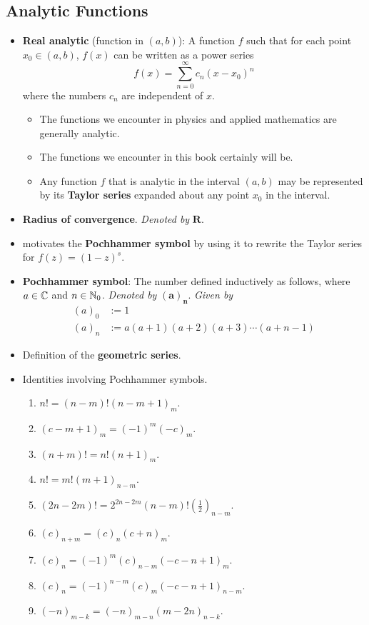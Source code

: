 \documentclass[../finalProject.tex]{subfiles}
\begin{document}
\subsection{Analytic Functions}\label{sss:2.2}
\begin{itemize}
    \item \textbf{Real analytic} (function in $(a,b)$): A function $f$ such that for each point $x_0\in(a,b)$, $f(x)$ can be written as a power series
    \begin{equation*}
        f(x) = \sum_{n=0}^\infty c_n(x-x_0)^n
    \end{equation*}
    where the numbers $c_n$ are independent of $x$.
    \begin{itemize}
        \item The functions we encounter in physics and applied mathematics are generally analytic.
        \item The functions we encounter in this book certainly will be.
        \item Any function $f$ that is analytic in the interval $(a,b)$ may be represented by its \textbf{Taylor series} expanded about any point $x_0$ in the interval.
    \end{itemize}
    \item \textbf{Radius of convergence}. \emph{Denoted by} $\bm{R}$.
    \item \textcite{bib:Seaborn} motivates the \textbf{Pochhammer symbol} by using it to rewrite the Taylor series for $f(z)=(1-z)^s$.
    \item \textbf{Pochhammer symbol}: The number defined inductively as follows, where $a\in\mathbb{C}$ and $n\in\mathbb{N}_0$. \emph{Denoted by} $\bm{(a)_n}$. \emph{Given by}
    \begin{align*}
        (a)_0 &:= 1\\
        (a)_n &:= a(a+1)(a+2)(a+3)\cdots(a+n-1)\tag{$n=1,2,3,\dots$}
    \end{align*}
    \item Definition of the \textbf{geometric series}.
    \item Identities involving Pochhammer symbols.
    \begin{enumerate}
        \item $n!=(n-m)!(n-m+1)_m$.
        \item $(c-m+1)_m=(-1)^m(-c)_m$.
        \item $(n+m)!=n!(n+1)_m$.
        \item $n!=m!(m+1)_{n-m}$.
        \item $(2n-2m)!=2^{2n-2m}(n-m)!(\frac{1}{2})_{n-m}$.
        \item $(c)_{n+m}=(c)_n(c+n)_m$.
        \item $(c)_n=(-1)^m(c)_{n-m}(-c-n+1)_m$.
        \item $(c)_n=(-1)^{n-m}(c)_m(-c-n+1)_{n-m}$.
        \item $(-n)_{m-k}=(-n)_{m-n}(m-2n)_{n-k}$.
    \end{enumerate}
\end{itemize}
\end{document}
